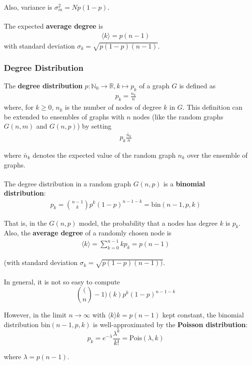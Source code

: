 \documentclass[a4paper,11pt]{article}
\begin{document}
Also, variance is $\sigma^2_m = Np(1-p)$.
\\\\
The expected \textbf{average degree} is
\begin{align*}
    \langle k\rangle = p(n-1)
\end{align*}
with standard deviation $\sigma_k = \sqrt{p(1-p) (n-1)}$.


\subsubsection{Degree Distribution}
The \textbf{degree distribution} $p: \mathbb{N}_0 \to \mathbb{R}, k \mapsto p_k$ of a graph $G$ is defined as 
\begin{align*}
    p_k = \frac{n_k}{n}
\end{align*}
where, for $k \geq 0$, $n_k$ is the number of nodes of degree $k$ in $G$.
This definition can be extended to ensembles of graphs with $n$ nodes (like the random graphs $G(n,m)$ and $G(n,p)$) by setting 
\begin{align*}
    p_k \frac{\bar{n}_k}{n}
\end{align*}

where $\bar{n}_k$ denotes the expected value of the random graph $n_k$ over the ensemble of graphs.
\\\\
The degree distribution in a random graph $G(n,p)$ is a \textbf{binomial distribution}:
\begin{align*}
    p_k = \binom{n-1}{k}p^k (1-p)^{n-1-k} = \text{bin}(n-1,p,k)
\end{align*}

That is, in the $G(n,p)$ model, the probability that a nodes has degree $k$ is $p_k$.
Also, the \textbf{average degree} of a randomly chosen node is
\begin{align*}
    \langle k \rangle = \sum^{n-1}_{k=0} kp_k = p(n-1)
\end{align*}

(with standard deviation $\sigma_k = \sqrt{p(1-p)(n-1))}$.
\\\\
In general, it is not so easy to compute
\[
    \binom(n-1)(k) p^k (1-p)^{n-1-k}
\]

However, in the limit $n \to \infty$ with $\langle k \rangle k = p(n-1)$ kept constant, the binomial distribution $\text{bin}(n-1,p,k)$ is well-approximated by the \textbf{Poisson distribution}:
\[
    p_k = e^{-\lambda} \frac{\lambda^k}{k!} = \text{Pois}(\lambda, k)
\]

where $\lambda = p(n-1)$.
\end{document}

